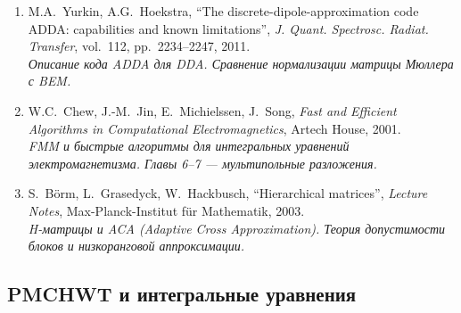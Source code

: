 \documentclass[12pt,a4paper]{article}
\begin{document}
\begin{enumerate}
  \item M.A.~Yurkin, A.G.~Hoekstra, ``The discrete-dipole-approximation code ADDA: capabilities and known limitations'', \textit{J. Quant. Spectrosc. Radiat. Transfer}, vol.~112, pp.~2234--2247, 2011.
  \\ \textit{Описание кода ADDA для DDA. Сравнение нормализации матрицы Мюллера с BEM.}

  \item W.C.~Chew, J.-M.~Jin, E.~Michielssen, J.~Song, \textit{Fast and Efficient Algorithms in Computational Electromagnetics}, Artech House, 2001.
  \\ \textit{FMM и быстрые алгоритмы для интегральных уравнений электромагнетизма. Главы 6--7 --- мультипольные разложения.}

  \item S.~B{\"o}rm, L.~Grasedyck, W.~Hackbusch, ``Hierarchical matrices'', \textit{Lecture Notes}, Max-Planck-Institut f{\"u}r Mathematik, 2003.
  \\ \textit{H-матрицы и ACA (Adaptive Cross Approximation). Теория допустимости блоков и низкоранговой аппроксимации.}
\end{enumerate}

\subsection{PMCHWT и интегральные уравнения}
\end{document}
